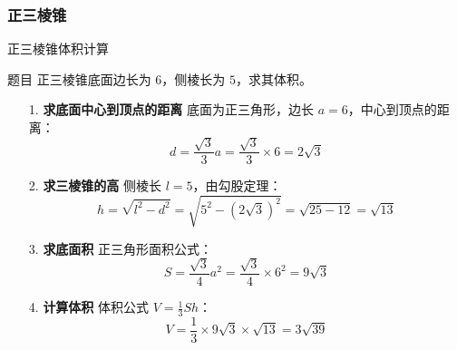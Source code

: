 \subsubsection{正三棱锥}



\begin{frame}{正三棱锥体积计算}
    \begin{block}{题目}
      正三棱锥底面边长为 \(6\)，侧棱长为 \(5\)，求其体积。
    \end{block}
  
    \pause
    \begin{enumerate}
      \item[1.] \textbf{求底面中心到顶点的距离}  
        底面为正三角形，边长 \(a = 6\)，中心到顶点的距离：  
        \[
        d = \frac{\sqrt{3}}{3}a = \frac{\sqrt{3}}{3} \times 6 = 2\sqrt{3}
        \]
  
      \item[2.] \textbf{求三棱锥的高}  
        侧棱长 \(l = 5\)，由勾股定理：  
        \[
        h = \sqrt{l^2 - d^2} = \sqrt{5^2 - (2\sqrt{3})^2} = \sqrt{25 - 12} = \sqrt{13}
        \]
  
      \item[3.] \textbf{求底面积}  
        正三角形面积公式：  
        \[
        S = \frac{\sqrt{3}}{4}a^2 = \frac{\sqrt{3}}{4} \times 6^2 = 9\sqrt{3}
        \]
  
      \item[4.] \textbf{计算体积}  
        体积公式 \(V = \frac{1}{3}Sh\)：  
        \[
        V = \frac{1}{3} \times 9\sqrt{3} \times \sqrt{13} = 3\sqrt{39}
        \]
    \end{enumerate}
  
  \end{frame}
  
